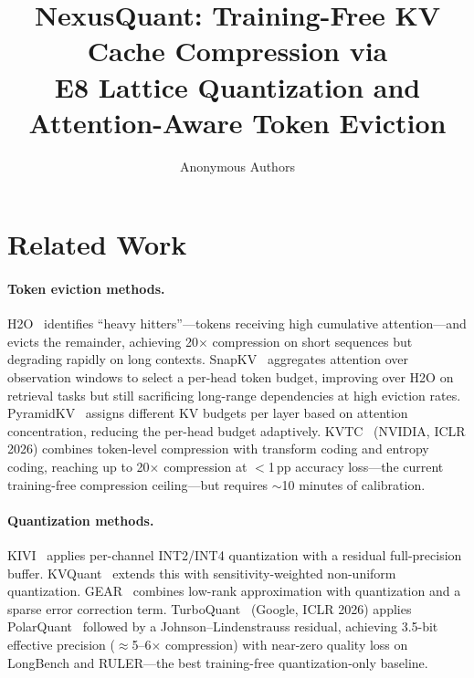 \documentclass{article}
\title{NexusQuant: Training-Free KV Cache Compression via\\
       E8 Lattice Quantization and Attention-Aware Token Eviction}
\author{
  Anonymous Authors
}
\begin{document}
\maketitle





\section{Related Work}
\label{sec:related}

\paragraph{Token eviction methods.}
H2O~\cite{h2o2023} identifies ``heavy hitters''---tokens receiving high cumulative
attention---and evicts the remainder, achieving 20$\times$ compression on short
sequences but degrading rapidly on long contexts. SnapKV~\cite{snapkv2024}
aggregates attention over observation windows to select a per-head token budget,
improving over H2O on retrieval tasks but still sacrificing long-range dependencies
at high eviction rates. PyramidKV~\cite{pyramidkv2024} assigns different KV budgets
per layer based on attention concentration, reducing the per-head budget adaptively.
KVTC~\cite{kvtc2026} (NVIDIA, ICLR 2026) combines token-level compression with
transform coding and entropy coding, reaching up to 20$\times$ compression at
$<$1\,pp accuracy loss---the current training-free compression ceiling---but requires
$\sim$10 minutes of calibration.

\paragraph{Quantization methods.}
KIVI~\cite{kivi2024} applies per-channel INT2/INT4 quantization with a residual
full-precision buffer. KVQuant~\cite{kvquant2024} extends this with sensitivity-weighted
non-uniform quantization. GEAR~\cite{gear2024} combines low-rank approximation with
quantization and a sparse error correction term. TurboQuant~\cite{turboquant2026}
(Google, ICLR 2026) applies PolarQuant~\cite{polarquant2026} followed by a
Johnson--Lindenstrauss residual, achieving 3.5-bit effective precision ($\approx$5--6$\times$
compression) with near-zero quality loss on LongBench and RULER---the best training-free
quantization-only baseline.
\end{document}
